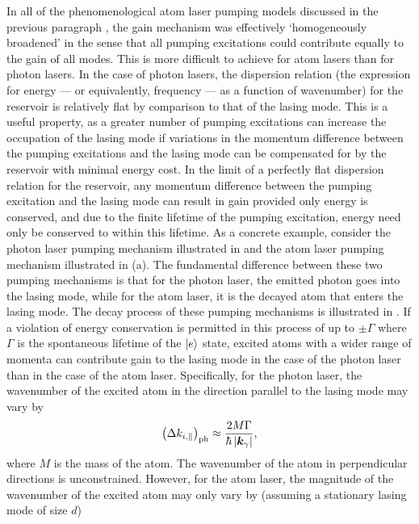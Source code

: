 In all of the phenomenological atom laser pumping models discussed in the previous paragraph \citep{Haine:2002kp,Kneer:1998fk,Robins:2001pd}, the gain mechanism was effectively `homogeneously broadened' in the sense that all pumping excitations could contribute equally to the gain of all modes.  This is more difficult to achieve for atom lasers than for photon lasers.  In the case of photon lasers, the dispersion relation (the expression for energy --- or equivalently, frequency --- as a function of wavenumber) for the reservoir is relatively flat by comparison to that of the lasing mode.  This is a useful property, as a greater number of pumping excitations can increase the occupation of the lasing mode if variations in the momentum difference between the pumping excitations and the lasing mode can be compensated for by the reservoir with minimal energy cost.  In the limit of a perfectly flat dispersion relation for the reservoir, any momentum difference between the pumping excitation and the lasing mode can result in gain provided only energy is conserved, and due to the finite lifetime of the pumping excitation, energy need only be conserved to within this lifetime.  As a concrete example, consider the photon laser pumping mechanism illustrated in  and the atom laser pumping mechanism illustrated in (a).  The fundamental difference between these two pumping mechanisms is that for the photon laser, the emitted photon goes into the lasing mode, while for the atom laser, it is the decayed atom that enters the lasing mode.  The decay process of these pumping mechanisms is illustrated in .  If a violation of energy conservation is permitted in this process of up to $\pm \Gamma$ where $\Gamma$ is the spontaneous lifetime of the ${\left|e\right>}$ state, excited atoms with a wider range of momenta can contribute gain to the lasing mode in the case of the photon laser than in the case of the atom laser.  Specifically, for the photon laser, the wavenumber of the excited atom in the direction parallel to the lasing mode may vary by
\begin{align*}
    \left(\Delta k_{i,\parallel}\right)_\text{ph} \approx \frac{2 M \Gamma}{\hbar \left|\bm{k}_\gamma\right|},
\end{align*}
where $M$ is the mass of the atom.  The wavenumber of the atom in perpendicular directions is unconstrained.  However, for the atom laser, the magnitude of the wavenumber of the excited atom may only vary by (assuming a stationary lasing mode of size $d$)
